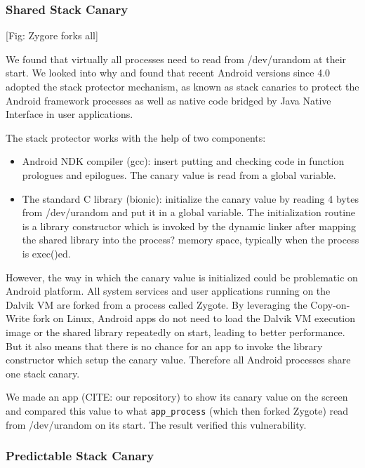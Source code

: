 \subsubsection{Shared Stack Canary}

[Fig: Zygore forks all]

We found that virtually all processes need to read from /dev/urandom at their start. We looked into why and found that recent Android versions since 4.0 adopted the stack protector mechanism, as known as stack canaries to protect the Android framework processes as well as native code bridged by Java Native Interface in user applications.

The stack protector works with the help of two components:
\begin{itemize}

\item Android NDK compiler (gcc): insert putting and checking code in function prologues and epilogues. The canary value is read from a global variable.
\item The standard C library (bionic): initialize the canary value by reading 4 bytes from /dev/urandom and put it in a global variable. The initialization routine is a library constructor which is invoked by the dynamic linker after mapping the shared library into the process? memory space, typically when the process is exec()ed.
\end{itemize}

However, the way in which the canary value is initialized could be problematic on Android platform. All system services and user applications running on the Dalvik VM are forked from a process called Zygote. By leveraging the Copy-on-Write fork on Linux, Android apps do not need to load the Dalvik VM execution image or the shared library repeatedly on start, leading to better performance. But it also means that there is no chance for an app to invoke the library constructor which setup the canary value. Therefore all Android processes share one stack canary.

We made an app (CITE: our repository) to show its canary value on the screen and compared this value to what \verb|app_process| (which then forked Zygote) read from /dev/urandom on its start. The result verified this vulnerability. 

\subsubsection{Predictable Stack Canary}

